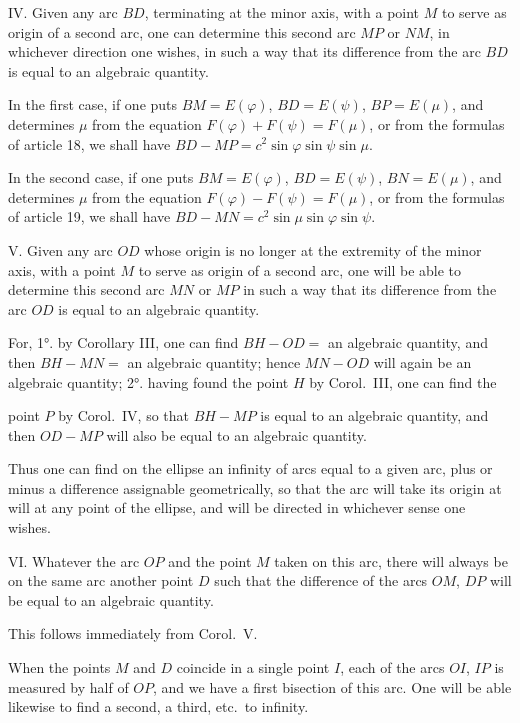 \documentclass{article}
\begin{document}
IV. Given any arc $BD$, terminating at the minor axis, with a point $M$ to serve as origin of a second arc, one can determine this second arc $MP$ or $NM$, in whichever direction one wishes, in such a way that its difference from the arc $BD$ is equal to an algebraic quantity.

In the first case, if one puts $BM=E(\varphi)$, $BD=E(\psi)$, $BP=E(\mu)$, and determines $\mu$ from the equation $F(\varphi)+F(\psi)=F(\mu)$, or from the formulas of article 18, we shall have $BD-MP=c^{2}\sin\varphi\sin\psi\sin\mu$.

In the second case, if one puts $BM=E(\varphi)$, $BD=E(\psi)$, $BN=E(\mu)$, and determines $\mu$ from the equation $F(\varphi)-F(\psi)=F(\mu)$, or from the formulas of article 19, we shall have $BD-MN=c^{2}\sin\mu\sin\varphi\sin\psi$.


V. Given any arc $OD$ whose origin is no longer at the extremity of the minor axis, with a point $M$ to serve as origin of a second arc, one will be able to determine this second arc $MN$ or $MP$ in such a way that its difference from the arc $OD$ is equal to an algebraic quantity.

For, 1°. by Corollary III, one can find $BH-OD=$ an algebraic quantity, and then $BH-MN=$ an algebraic quantity; hence $MN-OD$ will again be an algebraic quantity; 2°. having found the point $H$ by Corol.\ III, one can find the

point $P$ by Corol.\ IV, so that $BH-MP$ is equal to an algebraic quantity, and then $OD-MP$ will also be equal to an algebraic quantity.

Thus one can find on the ellipse an infinity of arcs equal to a given arc, plus or minus a difference assignable geometrically, so that the arc will take its origin at will at any point of the ellipse, and will be directed in whichever sense one wishes.

VI. Whatever the arc $OP$ and the point $M$ taken on this arc, there will always be on the same arc another point $D$ such that the difference of the arcs $OM$, $DP$ will be equal to an algebraic quantity.

This follows immediately from Corol.\ V.

When the points $M$ and $D$ coincide in a single point $I$, each of the arcs $OI$, $IP$ is measured by half of $OP$, and we have a first bisection of this arc. One will be able likewise to find a second, a third, etc.\ to infinity.
\end{document}
